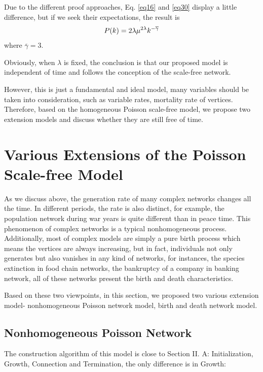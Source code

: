 \documentclass[final]{IEEEtran}
\begin{document}
Due to the different proof approaches, Eq. \ref{eq16} and
\ref{eq30} display a little difference, but if we seek their
expectations, the result is
\begin{equation}\footnotesize
P(k)=2\lambda\mu^{2\lambda}k^{-\overline{\gamma}}
\end{equation}
where $\overline{\gamma}$$=$$3$.

Obviously, when $\lambda$ is fixed, the conclusion is that our
proposed model is independent of time and follows the conception
of the scale-free network.

However, this is just a fundamental and ideal model, many
variables should be taken into consideration, such as variable
rates, mortality rate of vertices. Therefore, based on the
homogeneous Poisson scale-free model, we propose two extension
models and discuss whether they are still free of time.

\section{Various Extensions of the Poisson Scale-free Model}
As we discuss above, the generation rate of many complex networks
changes all the time. In different periods, the rate is also
distinct, for example, the population network during war years is
quite different than in peace time. This phenomenon of complex
networks is a typical nonhomogeneous process. Additionally, most
of complex models are simply a pure birth process which means the
vertices are always increasing, but in fact, individuals not only
generates but also vanishes in any kind of networks, for
instances, the species extinction in food chain networks, the
bankruptcy of a company in banking network, all of these networks
present the birth and death characteristics.

Based on these two viewpoints, in this section, we proposed two
various extension model- nonhomogeneous Poisson network model,
birth and death network model.

\subsection{Nonhomogeneous Poisson Network}
The construction algorithm of this model is close to Section II.
A: Initialization, Growth, Connection and Termination, the only
difference is in Growth:

\end{document}

